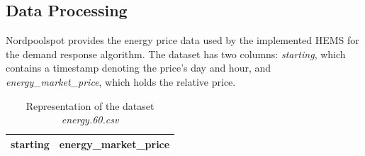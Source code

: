 \subsection{Data Processing}
Nordpoolspot \cite{nordpool} provides the energy price data used by the implemented HEMS for the demand response algorithm. The dataset has two columns: \textit{starting}, which contains a timestamp denoting the price's day and hour, and \textit{energy\_market\_price}, which holds the relative price.
\begin{table}[H]
\centering
\begin{tabular}{|c|c|}
\hline
\textbf{starting} & \textbf{energy\_market\_price} \\ \hline
\end{tabular}
\caption{Representation of the dataset \textit{energy.60.csv}}
\label{tab:dataset_energy_60}
\end{table}

